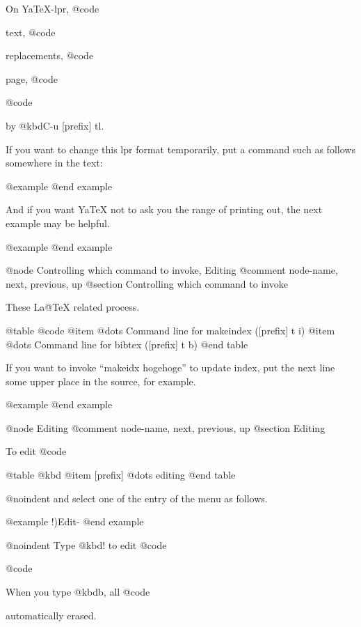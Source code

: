 {{{{{{{{{{{{{{{{{  On YaTeX-lpr, @code{%
text, @code{%
replacements, @code{%
page, @code{%
@code{%
by @kbd{C-u [prefix] tl}.

  If you want to change this lpr format temporarily, put a command
such as follows somewhere in the text:

@example
@end example

  And if you want YaTeX not to ask you the range of printing
out, the next example may be helpful.

@example
@end example

@node Controlling which command to invoke, Editing %
@comment  node-name,  next,  previous,  up
@section Controlling which command to invoke

These %
La@TeX{} related process.

@table @code
 @item %
	@dots{} Command line for makeindex ([prefix] t i)
 @item %
	@dots{} Command line for bibtex ([prefix] t b)
@end table

If you want to invoke ``makeidx hogehoge'' to update index,
put the next line some upper place in the source, for example.

@example
@end example


@node Editing %
@comment  node-name,  next,  previous,  up
@section Editing %

  To edit @code{%

@table @kbd
@item [prefix] %
        @dots{} editing %
@end table

@noindent
and select one of the entry of the menu as follows.

@example
        !)Edit-%
@end example

@noindent
Type @kbd{!} to edit @code{%
@code{%
When you type @kbd{b}, all @code{%
automatically erased.

}}}}}}}}}}}}}}}}}}}}}}}}}}
